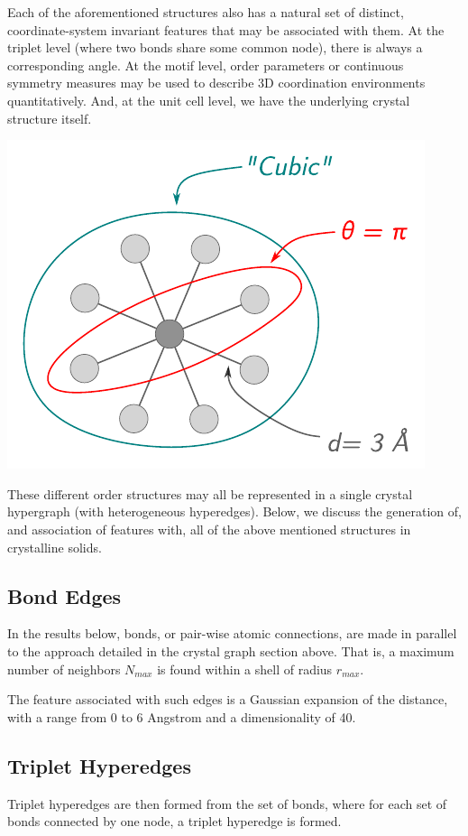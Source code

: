 \documentclass[10pt,a4paper]{article}
\begin{document}
Each of the aforementioned structures also has a natural set of distinct, coordinate-system invariant features that may be associated with them. At the triplet level (where two bonds share some common node), there is always a corresponding angle. At the motif level, order parameters \cite{orderparam1, orderparam2} or continuous symmetry measures \cite{csm_polyhedra, chemenv} may be used to describe 3D coordination environments quantitatively. And, at the unit cell level, we have the underlying crystal structure itself.
\begin{center}
\includegraphics[scale=0.7]{hypergraph_6.pdf}
\end{center}
These different order structures may all be represented in a single crystal hypergraph (with heterogeneous hyperedges). Below, we discuss the generation of, and association of features with, all of the above mentioned structures in crystalline solids. 

\subsection{Bond Edges}
In the results below, bonds, or pair-wise atomic connections, are made in parallel to the approach detailed in the crystal graph section above. That is, a maximum number of neighbors $N_{max}$ is found within a shell of radius $r_{max}$. 

The feature associated with such edges is a Gaussian expansion of the distance, with a range from 0 to 6 Angstrom and a dimensionality of 40.

\subsection{Triplet Hyperedges}
Triplet hyperedges are then formed from the set of bonds, where for each set of bonds connected by one node, a triplet hyperedge is formed.
\end{document}

